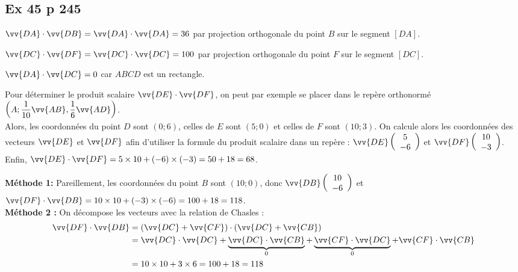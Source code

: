 \documentclass[12pt,a4paper]{book}
\begin{document}
\subsection*{Ex 45 p 245}
\begin{enumMet}
    \item $\vv{D A} \cdot \vv{D B}=\vv{D A} \cdot \vv{D A}=36$ par projection orthogonale du point $B$ sur le segment $[D A]$.
    \item  $\vv{D C} \cdot \vv{D F}=\vv{D C} \cdot \vv{D C}=100$ par projection orthogonale du point $F$ sur le segment $[D C]$.
    \item $\vv{D A} \cdot \vv{D C}=0$ car $A B C D$ est un rectangle.
    \item Pour déterminer le produit scalaire $\vv{D E} \cdot \vv{D F}$, on peut par exemple se placer dans le repère orthonormé $\left(A ; \dfrac{1}{10} \vv{A B}, \dfrac{1}{6} \vv{A D}\right)$.\\
    Alors, les coordonnées du point $D$ sont $(0 ; 6)$, celles de $E$ sont $(5 ; 0)$ et celles de $F$ sont $(10 ; 3)$. On calcule alors les coordonnées des vecteurs $\vv{D E}$ et $\vv{D F}$ afin d'utiliser la formule du produit scalaire dans un repère : $\vv{D E}\left(\begin{array}{c}5 \\ -6\end{array}\right)$ et $\vv{D F}\left(\begin{array}{c}10 \\ -3\end{array}\right)$.
Enfin, $\vv{D E} \cdot \vv{D F}=5 \times 10+(-6) \times(-3)=50+18=68$.
\item \textbf{Méthode 1:} Pareillement, les coordonnées du point $B$ sont $(10 ; 0)$, donc $\vv{D B}\left(\begin{array}{c}10 \\ -6\end{array}\right)$ et $\vv{D F} \cdot \vv{D B}=10 \times 10+(-3) \times(-6)=100+18=118$.\\
\textbf{Méthode 2 :} On décompose les vecteurs avec la relation de Chasles :
$$
\begin{aligned}
\vv{D F} \cdot \vv{D B} &=(\vv{D C}+\vv{C F}) \cdot(\vv{D C}+\vv{C B}) \\
&=\vv{D C} \cdot \vv{D C}+\underbrace{\vv{D C} \cdot \vv{C B}}_{0}+\underbrace{\vv{C F} \cdot \vv{D C}}_{0}+\vv{C F} \cdot \vv{C B} \\
&=10 \times 10+3 \times 6=100+18=118
\end{aligned}
$$
\end{enumMet}
\end{document}
